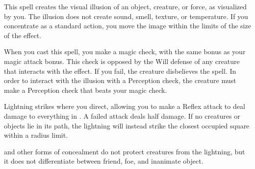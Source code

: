 \spellrng{\rngmed}
\spelldur{\durshort}
\begin{spelleffect}
  This spell creates the visual illusion of an object, creature, or force, as visualized by you. The illusion does not create sound, smell, texture, or temperature. If you concentrate as a standard action, you move the image within the limits of the size of the effect.
\end{spelleffect}
\begin{spellnotes}
    When you cast this spell, you make a magic check, with the same bonus as your magic attack bonus. This check is opposed by the Will defense of any creature that interacts with the effect. If you fail, the creature disbelieves the spell. In order to interact with the illusion with a Perception check, the creature must make a Perception check that beats your magic check.
\end{spellnotes}

\spellrng{\rngext}
\begin{spelleffect}
  Lightning strikes where you direct, allowing you to make a Reflex attack to deal damage to everything in . A failed attack deals half damage. If no creatures or objects lie in its path, the lightning will instead strike the closest occupied square within a \areamed radius limit.
\end{spelleffect}
\begin{spellnotes}
  and other forms of concealment do not protect creatures from the lightning, but it does not differentiate between friend, foe, and inanimate object.
\end{spellnotes}

